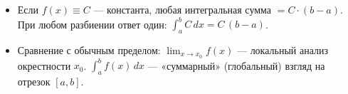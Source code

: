 \begin{customexample}
	\begin{itemize}
		\item Если $f(x) \equiv C$ — константа, любая интегральная сумма $=C\cdot(b-a)$.
		      При любом разбиении ответ один: $\int_a^b C\,dx = C\,(b-a)$.
		\item Сравнение с обычным пределом:
		      \(\lim_{x\to x_0}f(x)\) — локальный анализ окрестности $x_0$.
		      \(\int_a^b f(x)\,dx\) — «суммарный» (глобальный) взгляд на отрезок $[a,b]$.
	\end{itemize}
\end{customexample}

